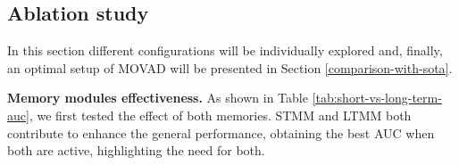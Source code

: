 \subsection{Ablation study}
In this section different configurations will be individually explored and, finally, an optimal setup of MOVAD will be presented in Section \ref{comparison-with-sota}.

\noindent\textbf{Memory modules effectiveness.}
As shown in Table \ref{tab:short-vs-long-term-auc}, we first tested the effect of both memories.
STMM and LTMM both contribute to enhance the general performance, obtaining the best AUC when both are active, highlighting the need for both. 


